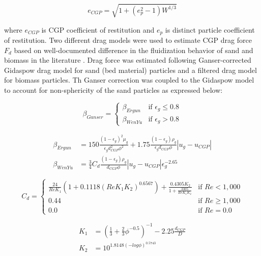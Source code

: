 \begin{equation}
    e_{CGP} = \sqrt{1 + (e_p^2 - 1) W^{1/3}}
\end{equation}

where $e_{CGP}$ is CGP coefficient of restitution and $e_p$ is distinct particle coefficient of restitution. Two different drag models were used to estimate CGP drag force $F_d$ based on well-documented difference in the fluidization behavior of sand and biomass in the literature \cite{Oliveira-2013}. Drag force was estimated following Ganser-corrected Gidaspow drag model for sand (bed material) particles and a filtered drag model for biomass particles. Th Ganser correction \cite{Ganser-1993} was coupled to the Gidaspow model \cite{Gidaspow-1994} to account for non-sphericity of the sand particles as expressed below:

\begin{equation}
    \beta_{Ganser} =
    \begin{cases}
        \beta_{Ergun} & \text{if } \epsilon_g \leq 0.8 \\
        \beta_{WenYu} & \text{if } \epsilon_g > 0.8
    \end{cases}
\end{equation}

\begin{align}
    \beta_{Ergun} &= 150 \frac{(1 - \epsilon_g)^2 \mu_g}{\epsilon_g d^2_{CGP} \phi^2} + 1.75 \frac{(1 - \epsilon_g) \rho_g}{\epsilon_g d_{CGP} \phi} |u_g - u_{CGP}| \\
    \beta_{WenYu} &= \frac{3}{4} C_d \frac{(1 - \epsilon_g) \rho_g}{d_{CGP} \phi} |u_g - u_{CGP}| \epsilon_g^{-2.65}
\end{align}

\begin{equation}
    C_d =
    \begin{cases}
        \frac{24}{Re K_1} (1 + 0.1118(Re K_1 K_2)^{0.6567}) + \frac{0.4305 K_2}{1 + \frac{3305}{Re K_1 K_2}} & \text{if } Re < 1,000 \\
        0.44 & \text{if } Re \geq 1,000 \\
        0.0 & \text{if } Re = 0.0
    \end{cases}
\end{equation}

\begin{align}
    K_1 &= \left(\frac{1}{3} + \frac{2}{3} \phi^{-0.5} \right)^{-1} - 2.25 \frac{d_{CGP}}{D} \\
    K_2 &= 10^{1.8148 (-log \phi)^{0.5743}}
\end{align}

